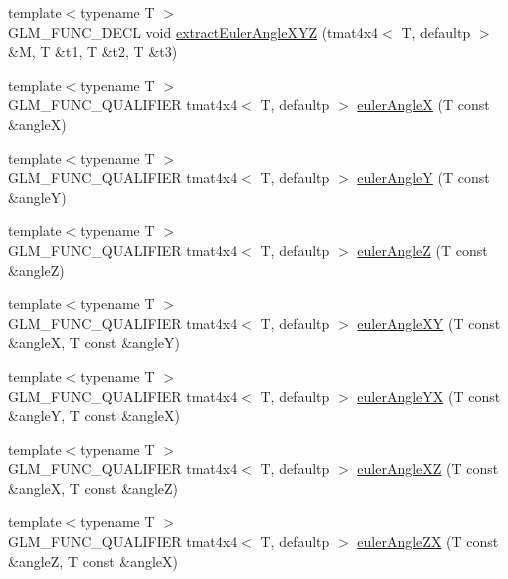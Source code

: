 \begin{DoxyCompactItemize}
\item 
{\footnotesize template$<$typename T $>$ }\\G\+L\+M\+\_\+\+F\+U\+N\+C\+\_\+\+D\+E\+C\+L void \hyperlink{group__gtx__euler__angles_ga77ab6440250bd8b7e87a06c5643d6e74}{extract\+Euler\+Angle\+X\+Y\+Z} (tmat4x4$<$ T, defaultp $>$ \&M, T \&t1, T \&t2, T \&t3)
\item 
{\footnotesize template$<$typename T $>$ }\\G\+L\+M\+\_\+\+F\+U\+N\+C\+\_\+\+Q\+U\+A\+L\+I\+F\+I\+E\+R tmat4x4$<$ T, defaultp $>$ \hyperlink{group__gtx__euler__angles_ga82cd3b8a04943f1a0d1a562aff358dc8}{euler\+Angle\+X} (T const \&angle\+X)
\item 
{\footnotesize template$<$typename T $>$ }\\G\+L\+M\+\_\+\+F\+U\+N\+C\+\_\+\+Q\+U\+A\+L\+I\+F\+I\+E\+R tmat4x4$<$ T, defaultp $>$ \hyperlink{group__gtx__euler__angles_gaeb193af1184bdf39c23636d756e1ff33}{euler\+Angle\+Y} (T const \&angle\+Y)
\item 
{\footnotesize template$<$typename T $>$ }\\G\+L\+M\+\_\+\+F\+U\+N\+C\+\_\+\+Q\+U\+A\+L\+I\+F\+I\+E\+R tmat4x4$<$ T, defaultp $>$ \hyperlink{group__gtx__euler__angles_gab59c4fe7f735568255cc19fddd3ddfcd}{euler\+Angle\+Z} (T const \&angle\+Z)
\item 
{\footnotesize template$<$typename T $>$ }\\G\+L\+M\+\_\+\+F\+U\+N\+C\+\_\+\+Q\+U\+A\+L\+I\+F\+I\+E\+R tmat4x4$<$ T, defaultp $>$ \hyperlink{group__gtx__euler__angles_ga8bf84f92ca976a7f50dbe4b30ceb72dd}{euler\+Angle\+X\+Y} (T const \&angle\+X, T const \&angle\+Y)
\item 
{\footnotesize template$<$typename T $>$ }\\G\+L\+M\+\_\+\+F\+U\+N\+C\+\_\+\+Q\+U\+A\+L\+I\+F\+I\+E\+R tmat4x4$<$ T, defaultp $>$ \hyperlink{group__gtx__euler__angles_gafdd02f9a37511190962119adef5c1c25}{euler\+Angle\+Y\+X} (T const \&angle\+Y, T const \&angle\+X)
\item 
{\footnotesize template$<$typename T $>$ }\\G\+L\+M\+\_\+\+F\+U\+N\+C\+\_\+\+Q\+U\+A\+L\+I\+F\+I\+E\+R tmat4x4$<$ T, defaultp $>$ \hyperlink{group__gtx__euler__angles_gab2d7dc94b9a7519d741aaa208c7a335b}{euler\+Angle\+X\+Z} (T const \&angle\+X, T const \&angle\+Z)
\item 
{\footnotesize template$<$typename T $>$ }\\G\+L\+M\+\_\+\+F\+U\+N\+C\+\_\+\+Q\+U\+A\+L\+I\+F\+I\+E\+R tmat4x4$<$ T, defaultp $>$ \hyperlink{group__gtx__euler__angles_gaef83cf40bd9ae780011b29970f16f622}{euler\+Angle\+Z\+X} (T const \&angle\+Z, T const \&angle\+X)

\end{DoxyCompactItemize}
